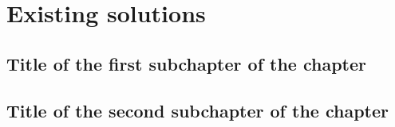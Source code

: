 \chapter{Existing solutions}

\section{Title of the first subchapter of the chapter}

\section{Title of the second subchapter of the chapter}
